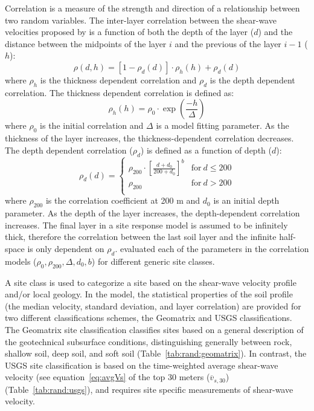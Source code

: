 \documentclass[12pt,oneside]{book}
\begin{document}
Correlation is a measure of the strength and direction of a relationship between two random
variables.  The inter-layer correlation between the shear-wave velocities proposed by
\citet{toro:95} is a function of both the depth of the layer ($d$) and the distance between the
midpoints of the layer $i$ and the previous of the layer $i-1$ ($h$):
\begin{equation}
    \rho(d,h) = \left[1 - \rho_d(d)\right] \cdot \rho_h(h) + \rho_d(d)
\end{equation}
where $\rho_h$ is the thickness dependent correlation and $\rho_d$ is the depth dependent
correlation.  The thickness dependent correlation is defined as:
\begin{equation}
    \rho_h(h) = \rho_0 \cdot \exp\left(\frac{-h}{\Delta}\right)
\end{equation}
where $\rho_0$ is the initial correlation and $\Delta$ is a model fitting parameter.  As the
thickness of the layer increases, the thickness-dependent correlation decreases.  The depth
dependent correlation ($\rho_d$) is defined as a function of depth ($d$):
\begin{equation}
    \rho_d(d) =
    \left\{
        \begin{array}{ll}
            \rho_{200} \cdot \left[ \frac{d+d_0}{200+d_0} \right]^b & \mathrm{for}\ d \leq 200 \\
            \rho_{200} & \mathrm{for}\ d > 200 \\
        \end{array}
    \right.
\end{equation}
where $\rho_{200}$ is the correlation coefficient at 200 m and $d_0$ is an initial depth parameter.
As the depth of the layer increases, the depth-dependent correlation increases.  The final layer in
a site response model is assumed to be infinitely thick, therefore the correlation between the last
soil layer and the infinite half-space is only dependent on $\rho_d$.  \citep{toro:95} evaluated
each of the parameters in the correlation models ($\rho_0, \rho_{200}, \Delta, d_0, b$) for
different generic site classes.

A site class is used to categorize a site based on the shear-wave velocity profile and/or local
geology.  In the \citet{toro:95} model, the statistical properties of the soil profile (the median
velocity, standard deviation, and layer correlation) are provided for two different classifications
schemes, the Geomatrix and USGS classifications. The Geomatrix site classification classifies sites
based on a general description of the geotechnical subsurface conditions, distinguishing generally
between rock, shallow soil, deep soil, and soft soil (Table~\ref{tab:rand:geomatrix}).  In contrast,
the USGS site classification is based on the time-weighted average shear-wave velocity (see
equation~\ref{eq:avgVs} of the top 30 meters ($\overline{v}_{s,30}$) (Table~\ref{tab:rand:usgs}),
and requires site specific measurements of shear-wave velocity.
\end{document}
